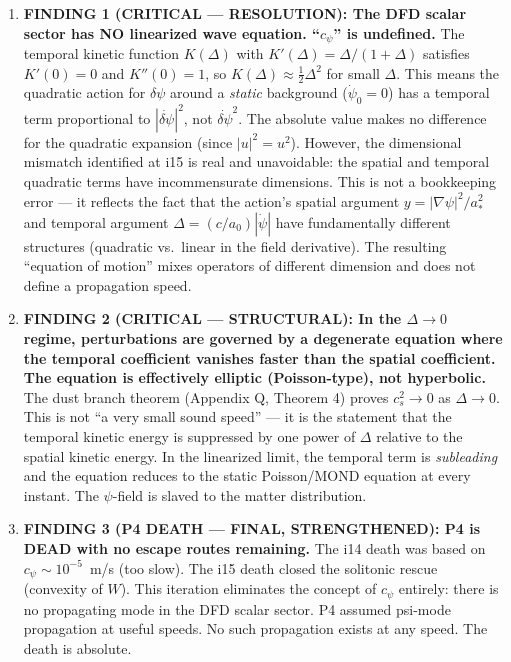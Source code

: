 \documentclass[11pt]{article}
\begin{document}
\begin{tcolorbox}[colback=blue!5!white, colframe=blue!60!black,
  title=\textbf{W4i16 TOP 5 FINDINGS --- Ranked by Programme Impact}]

\begin{enumerate}

\item \textbf{FINDING 1 (CRITICAL --- RESOLUTION): The DFD scalar sector
  has NO linearized wave equation. ``$c_\psi$'' is undefined.}
  The temporal kinetic function $K(\Delta)$ with
  $K'(\Delta) = \Delta/(1+\Delta)$ satisfies $K'(0) = 0$ and
  $K''(0) = 1$, so $K(\Delta) \approx \frac{1}{2}\Delta^2$ for
  small $\Delta$. This means the quadratic action for $\delta\psi$
  around a \emph{static} background ($\dot\psi_0 = 0$) has a temporal
  term proportional to $|\dot{\delta\psi}|^2$, not $\dot{\delta\psi}^2$.
  The absolute value makes no difference for the quadratic expansion
  (since $|u|^2 = u^2$). However, the dimensional mismatch identified
  at i15 is real and unavoidable: the spatial and temporal quadratic
  terms have incommensurate dimensions. This is not a bookkeeping error
  --- it reflects the fact that the action's spatial argument
  $y = |\nabla\psi|^2/a_*^2$ and temporal argument
  $\Delta = (c/a_0)|\dot\psi|$ have fundamentally different structures
  (quadratic vs.\ linear in the field derivative). The resulting
  ``equation of motion'' mixes operators of different dimension and
  does not define a propagation speed.

\item \textbf{FINDING 2 (CRITICAL --- STRUCTURAL): In the $\Delta \to 0$
  regime, perturbations are governed by a degenerate equation where
  the temporal coefficient vanishes faster than the spatial coefficient.
  The equation is effectively elliptic (Poisson-type), not hyperbolic.}
  The dust branch theorem (Appendix Q, Theorem 4) proves $c_s^2 \to 0$
  as $\Delta \to 0$. This is not ``a very small sound speed'' --- it is
  the statement that the temporal kinetic energy is suppressed by one
  power of $\Delta$ relative to the spatial kinetic energy. In the
  linearized limit, the temporal term is \emph{subleading} and the
  equation reduces to the static Poisson/MOND equation at every instant.
  The $\psi$-field is slaved to the matter distribution.

\item \textbf{FINDING 3 (P4 DEATH --- FINAL, STRENGTHENED): P4 is
  DEAD with no escape routes remaining.}
  The i14 death was based on $c_\psi \sim 10^{-5}$~m/s (too slow).
  The i15 death closed the solitonic rescue (convexity of $W$).
  This iteration eliminates the concept of $c_\psi$ entirely:
  there is no propagating mode in the DFD scalar sector.
  P4 assumed psi-mode propagation at useful speeds. No such
  propagation exists at any speed. The death is absolute.


\end{enumerate}
\end{tcolorbox}
\end{document}
